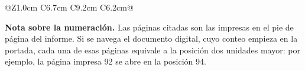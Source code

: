 \documentclass[11pt]{article}
\begin{document}
\begin{longtable}{@{}Z{1.0cm} C{6.7cm} C{9.2cm} C{6.2cm}@{}}
\end{longtable}
\endgroup

\vspace{0.4em}

\noindent
\small
\textbf{Nota sobre la numeración.} Las páginas citadas son las impresas en el pie de página del
informe. Si se navega el documento digital, cuyo conteo empieza en la portada, cada una de esas páginas
equivale a la posición dos unidades mayor: por ejemplo, la página impresa 92 se abre en la posición 94.
\end{document}
